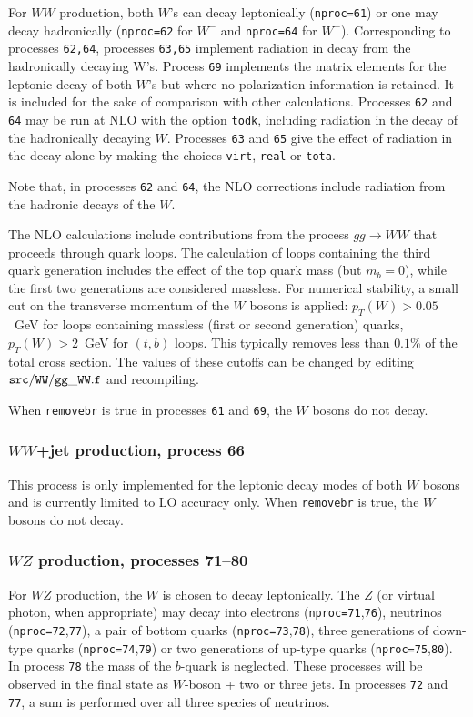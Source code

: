 \documentclass{article}
\begin{document}
For $WW$ production, both $W$'s can decay leptonically ({\tt nproc=61}) or one
may decay hadronically ({\tt nproc=62} for $W^-$ and {\tt nproc=64} for $W^+$).
Corresponding to processes {\tt 62,64}, processes {\tt 63,65} implement radiation in 
decay from the hadronically decaying W's.
Process {\tt 69} implements the matrix elements for the leptonic decay of
both $W$'s but where no polarization information is retained. It is included
for the sake of comparison with other calculations.
Processes {\tt 62} and {\tt 64} may be run at NLO with the option {\tt todk},
including radiation in the decay of the hadronically decaying $W$.
Processes {\tt 63} and {\tt 65} give the effect of radiation in the decay alone
by making the choices {\tt virt},  {\tt real} or {\tt tota}.

Note that, in processes
{\tt 62} and {\tt 64}, the NLO corrections include radiation from the
hadronic decays of the $W$.

The NLO calculations include contributions from the process $gg \to WW$
that proceeds through quark loops. The calculation of loops containing the third quark generation
includes the effect of the top quark mass (but $m_b=0$), while the first two
generations are considered massless. For numerical stability, a small cut on the
transverse momentum of the $W$ bosons is applied: $p_T(W)>0.05$~GeV for loops
containing massless (first or second generation) quarks, $p_T(W)>2$~GeV for $(t,b)$
loops. This typically removes less than $0.1$\% of the total cross section. The
values of these cutoffs can be changed by editing ${\tt src/WW/gg\_WW.f}$ and recompiling.

When {\tt removebr} is true in processes {\tt 61} and {\tt 69},
the $W$ bosons do not decay.

\subsubsection{$WW$+jet production, process 66}

This process is only implemented for the leptonic decay modes of both $W$
bosons and is currently limited to LO accuracy only. When {\tt removebr} is true,
the $W$ bosons do not decay.

\subsubsection{$WZ$ production, processes 71--80}

For $WZ$ production, the $W$ is chosen to decay leptonically. The $Z$ (or
virtual photon, when appropriate) may decay into electrons
({\tt nproc=71},{\tt 76}), neutrinos ({\tt nproc=72},{\tt 77}), a
pair of bottom quarks ({\tt nproc=73},{\tt 78}), three generations of down-type
quarks ({\tt nproc=74},{\tt 79}) or two generations of up-type quarks ({\tt nproc=75},{\tt 80}).
In process {\tt 78} the mass of the $b$-quark is neglected.
These processes will be observed
in the final state as $W$-boson + two or three jets.
In processes {\tt 72} and {\tt 77}, a sum is performed over all three species of neutrinos.
\end{document}
